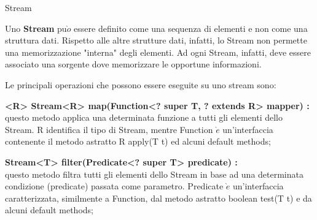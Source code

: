 \documentclass{beamer}
\begin{document}
\begin{frame}{Stream}
\fontsize{9pt}{7.2}\selectfont
\begin{flushleft}
Uno \textbf{Stream} pu$\grave{o}$ essere definito come una sequenza di elementi e non come una struttura dati. Rispetto alle altre strutture dati, infatti, lo Stream non permette una memorizzazione "interna" degli elementi.
Ad ogni Stream, infatti, deve essere associato una sorgente dove memorizzare le opportune informazioni.
\end{flushleft}
\begin{flushleft}
Le principali operazioni che possono essere eseguite su uno stream sono:
\end{flushleft}
\begin{flushleft}
\textbf{<R> Stream<R> map(Function<? super T, ? extends R> mapper) :} \\ questo metodo applica una determinata funzione a tutti gli elementi dello Stream. R identifica il tipo di Stream, mentre Function $\grave{e}$ un'interfaccia contenente il metodo astratto R apply(T t) ed alcuni default methods;
\end{flushleft}
\begin{flushleft}
\end{flushleft}
\begin{flushleft}
\textbf{Stream<T> filter(Predicate<? super T> predicate) :}\\ questo metodo filtra tutti gli elementi dello Stream in base ad una determinata condizione (predicate) passata come parametro. Predicate $\grave{e}$ un'interfaccia caratterizzata, similmente a Function, dal metodo astratto boolean test(T t) e da alcuni default methods;
\end{flushleft}
\end{frame}
\end{document}
